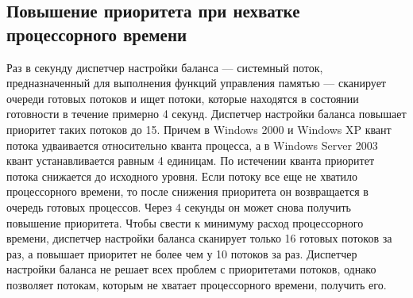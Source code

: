 \documentclass[a4paper,oneside,14pt]{extreport}
\begin{document}
	\subsection{Повышение приоритета при нехватке процессорного времени}
	Раз в секунду диспетчер настройки баланса --- системный поток, предназначенный для выполнения функций управления памятью --- сканирует очереди готовых потоков и ищет потоки, которые находятся в состоянии готовности в течение примерно 4 секунд. Диспетчер настройки баланса повышает приоритет таких потоков до 15. Причем в Windows 2000 и Windows XP квант потока удваивается относительно кванта процесса, а в Windows Server 2003 квант устанавливается равным 4 единицам. По истечении кванта приоритет потока снижается до исходного уровня. Если потоку все еще не хватило процессорного времени, то после снижения приоритета он возвращается в очередь готовых процессов. Через 4 секунды он может снова получить повышение приоритета.
	Чтобы свести к минимуму расход процессорного времени, диспетчер настройки баланса сканирует только 16 готовых потоков за раз, а повышает приоритет не более чем у 10 потоков за раз.
	Диспетчер настройки баланса не решает всех проблем с приоритетами потоков, однако позволяет потокам, которым не хватает процессорного времени, получить его.
\end{document}
